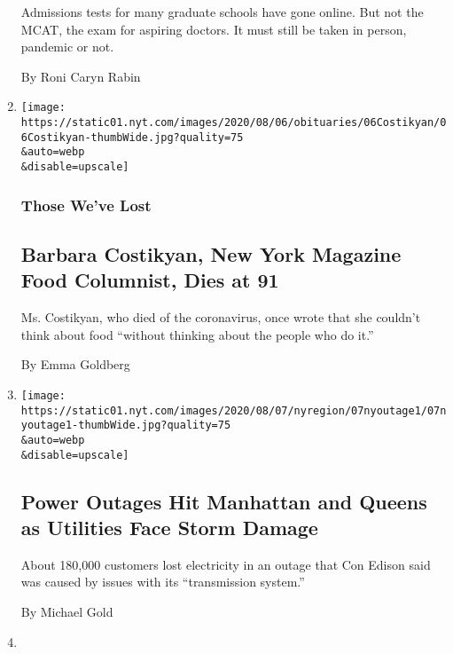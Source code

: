 \begin{enumerate}
  Admissions tests for many graduate schools have gone online. But not
  the MCAT, the exam for aspiring doctors. It must still be taken in
  person, pandemic or not.

  By Roni Caryn Rabin
\item
  \href{/2020/08/07/obituaries/barbara-costikyan-dead-coronavirus.html}{}

  \texttt{[image: https://static01.nyt.com/images/2020/08/06/obituaries/06Costikyan/06Costikyan-thumbWide.jpg?quality=75\\\&auto=webp\\\&disable=upscale]}

  \hypertarget{those-weve-lost}{%
  \subsubsection{Those We've Lost}\label{those-weve-lost}}

  \hypertarget{barbara-costikyan-new-york-magazine-food-columnist-dies-at-91}{%
  \subsection{Barbara Costikyan, New York Magazine Food Columnist, Dies
  at
  91}\label{barbara-costikyan-new-york-magazine-food-columnist-dies-at-91}}

  Ms. Costikyan, who died of the coronavirus, once wrote that she
  couldn't think about food ``without thinking about the people who do
  it.''

  By Emma Goldberg
\item
  \href{/2020/08/07/nyregion/queens-manhattan-west-side-power-outage-coned.html}{}

  \texttt{[image: https://static01.nyt.com/images/2020/08/07/nyregion/07nyoutage1/07nyoutage1-thumbWide.jpg?quality=75\\\&auto=webp\\\&disable=upscale]}

  \hypertarget{power-outages-hit-manhattan-and-queens-as-utilities-face-storm-damage}{%
  \subsection{Power Outages Hit Manhattan and Queens as Utilities Face
  Storm
  Damage}\label{power-outages-hit-manhattan-and-queens-as-utilities-face-storm-damage}}

  About 180,000 customers lost electricity in an outage that Con Edison
  said was caused by issues with its ``transmission system.''

  By Michael Gold
\item
  \href{/2020/08/07/realestate/coronavirus-coney-island-wonder-wheel.html}{}


\end{enumerate}
